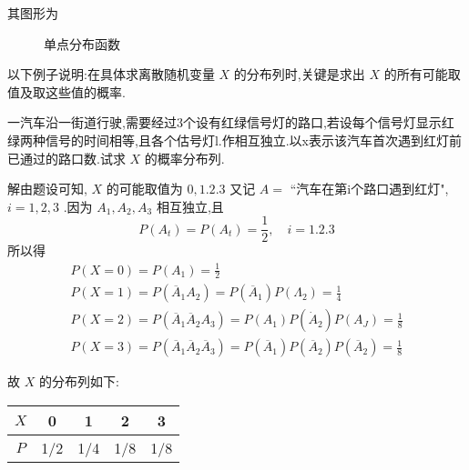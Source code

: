 \begin{example}
	其图形为
\begin{figure}[!ht]
    \centering
    \caption{单点分布函数}\label{fig:2.1.4}
\end{figure}

\end{example}

以下例子说明:在具体求离散随机变量 $ X $ 的分布列时,关键是求出 $ X $ 的所有可能取值及取这些值的概率.

\begin{example}\label{exam:2.1.5}
	一汽车沿一街道行驶,需要经过3个设有红绿信号灯的路口,若设每个信号灯显示红绿两种信号的时间相等,且各个估号灯l.作相互独立.以x表示该汽车首次遇到红灯前已通过的路口数.试求 $ X $ 的概率分布列.
	
	解由题设可知, $ X $ 的可能取值为 $ 0,1.2.3 $ 又记 $ A= $ ``汽车在第i个路口遇到红灯", $ i=1,2,3 $ .因为 $ A_1,A_2,A_3 $ 相互独立,且	
	\[ 
	P\left(A_{t}\right)=P\left(A_{t}\right)=\frac{1}{2}, \quad i=1.2 .3
	\]
	所以得	
	\[ 
	\begin{array}{l}
	{P(X=0)=P\left(A_{1}\right)=\frac{1}{2}} \\ 
	{P(X=1)=P\left(\overline{A}_{1} A_{2}\right)=P\left(\overline{A}_{1}\right) P\left(\Lambda_{2}\right)=\frac{1}{4}} \\ 
	{P(X=2)=P\left(\overline{A}_{1} \overline{A}_{2} A_{3}\right)=P\left(A_{1}\right) P\left(\dot{A}_{2}\right) P\left(A_{J}\right)=\frac{1}{8}}\\
	{P(X=3)=P\left(\overline{A}_{1} \overline{A}_{2} \overline{A}_{3}\right)=P\left(\overline{A}_{1}\right) P\left(\overline{A}_{2}\right) P\left(\overline{A}_{2}\right)=\frac{1}{8}}
	\end{array}
	\]
	
	故 $ X $ 的分布列如下:
	\begin{table}[htbp]
		\centering
		\begin{tabular}{c|cccc}
			 $ X $ & 0     & 1     & 2     & 3 \\\midrule
			 $ P $ & 1/2   & 1/4   & 1/8   & 1/8 \\
		\end{tabular}%
	\end{table}%
	
\end{example}

